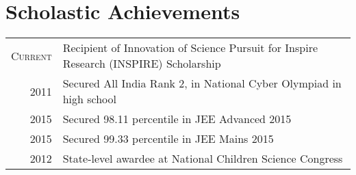 \documentclass[a4paper,10pt]{extarticle} %
\begin{document}

 \section{Scholastic Achievements}

\begin{tabular}{r|p{18cm}}
\textsc{Current} &{Recipient of Innovation of Science Pursuit for Inspire Research (INSPIRE) Scholarship}
\vspace{2mm} \\
\textsc{2011} &{Secured All India Rank 2, in National Cyber Olympiad in high school}
\vspace{2mm} \\
\textsc{2015} &{Secured 98.11 percentile in JEE Advanced 2015}
\vspace{2mm} \\
\textsc{2015} &{Secured 99.33 percentile in JEE Mains 2015}
\vspace{2mm} \\ 
\textsc{2012} &{State-level awardee at National Children Science Congress} \vspace{2mm} \\
\end{tabular}


\end{document}
